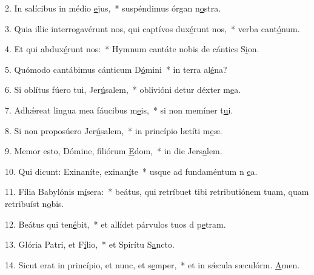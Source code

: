 2. In salícibus in médio \uline{e}jus,~* suspéndimus órgan n\uline{o}stra.\par 
3. Quia illic interrogavérunt nos, qui captívos dux\uline{é}runt nos,~* verba cant\uline{ó}num.\par 
4. Et qui abdux\uline{é}runt nos:~* Hymnum cantáte nobis de cántics S\uline{i}on.\par 
5. Quómodo cantábimus cánticum D\uline{ó}mini~* in terra al\uline{é}na?\par 
6. Si oblítus fúero tui, Jer\uline{ú}salem,~* oblivióni detur déxter m\uline{e}a.\par 
7. Adhǽreat lingua mea fáucibus m\uline{e}is,~* si non memíner t\uline{u}i.\par 
8. Si non proposúero Jer\uline{ú}salem,~* in princípio lætíti m\uline{e}æ.\par 
9. Memor esto, Dómine, filiórum \uline{E}dom,~* in die Jers\uline{a}lem.\par 
10. Qui dicunt: Exinaníte, exinan\uline{í}te~* usque ad fundaméntum n \uline{e}a.\par 
11. Fília Babylónis m\uline{í}sera:~* beátus, qui retríbuet tibi retributiónem tuam, quam retribuíst n\uline{o}bis.\par 
12. Beátus qui ten\uline{é}bit,~* et allídet párvulos tuos d p\uline{e}tram.\par 
13. Glória Patri, et F\uline{í}lio,~* et Spirítu S\uline{a}ncto.\par 
14. Sicut erat in princípio, et nunc, et s\uline{e}mper,~* et in sǽcula sæculórm. \uline{A}men.\par 
